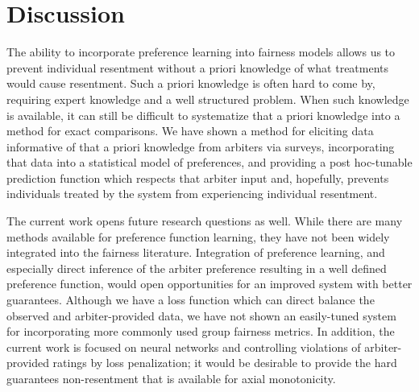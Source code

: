     \section{Discussion}\label{sec:sm_discussion}
    
        The ability to incorporate preference learning into fairness models allows us to prevent individual resentment without a priori knowledge of what treatments would cause resentment.  Such a priori knowledge is often hard to come by, requiring expert knowledge and a well structured problem.  When such knowledge is available, it can still be difficult to systematize that a priori knowledge into a method for exact comparisons.  We have shown a method for eliciting data informative of that a priori knowledge from arbiters via surveys, incorporating that data into a statistical model of preferences, and providing a post hoc-tunable prediction function which respects that arbiter input and, hopefully, prevents individuals treated by the system from experiencing individual resentment. 
        
        The current work opens future research questions as well.  While there are many methods available for preference function learning, they  have not been widely integrated into the fairness literature.  Integration of preference learning, and especially direct inference of the arbiter preference resulting in a well defined preference function, would open opportunities for an improved system with better guarantees. Although we have a loss function which can direct balance the observed and arbiter-provided data, we have not shown an easily-tuned system for incorporating more commonly used group fairness metrics.  In addition, the current work is focused on neural networks and controlling violations of arbiter-provided ratings by loss penalization; it would be desirable to provide the hard guarantees non-resentment that is available for axial monotonicity.